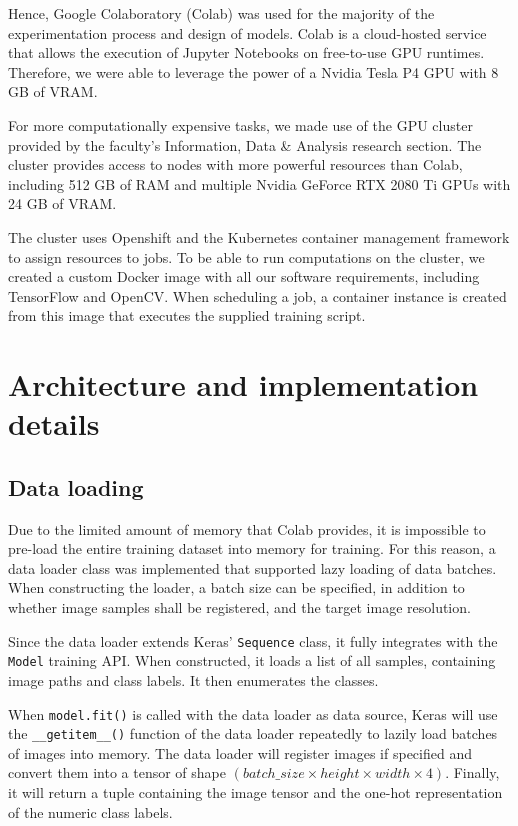 \documentclass{l4proj}
\begin{document}
Hence, Google Colaboratory (Colab) was used for the majority of the experimentation process and design of models. Colab is a cloud-hosted service that allows the execution of Jupyter Notebooks on free-to-use GPU runtimes. Therefore, we were able to leverage the power of a Nvidia Tesla P4 GPU with 8 GB of VRAM.

For more computationally expensive tasks, we made use of the GPU cluster provided by the faculty's Information, Data \& Analysis research section. The cluster provides access to nodes with more powerful resources than Colab, including 512 GB of RAM and multiple Nvidia GeForce RTX 2080 Ti GPUs with 24 GB of VRAM.

The cluster uses Openshift and the Kubernetes container management framework to assign resources to jobs. To be able to run computations on the cluster, we created a custom Docker image with all our software requirements, including TensorFlow and OpenCV. When scheduling a job, a container instance is created from this image that executes the supplied training script.


\section{Architecture and implementation details}

\subsection{Data loading}

Due to the limited amount of memory that Colab provides, it is impossible to pre-load the entire training dataset into memory for training. For this reason, a data loader class was implemented that supported lazy loading of data batches. When constructing the loader, a batch size can be specified, in addition to whether image samples shall be registered, and the target image resolution. 

Since the data loader extends Keras' \lstinline{Sequence} class, it fully integrates with the \lstinline{Model} training API. When constructed, it loads a list of all samples, containing image paths and class labels. It then enumerates the classes.

When \lstinline{model.fit()} is called with the data loader as data source, Keras will use the \lstinline{__getitem__()} function of the data loader repeatedly to lazily load batches of images into memory. The data loader will register images if specified and convert them into a tensor of shape $(batch\_size \times height \times width \times 4)$. Finally, it will return a tuple containing the image tensor and the one-hot representation of the numeric class labels.
\end{document}
